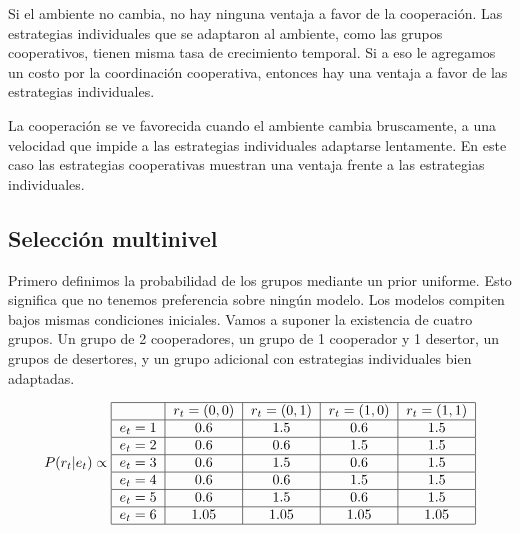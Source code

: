 \documentclass[a4paper,10pt]{article}
\begin{document}
Si el ambiente no cambia, no hay ninguna ventaja a favor de la cooperación.
Las estrategias individuales que se adaptaron al ambiente, como las grupos cooperativos, tienen misma tasa de crecimiento temporal.
Si a eso le agregamos un costo por la coordinación cooperativa, entonces hay una ventaja a favor de las estrategias individuales.

La cooperación se ve favorecida cuando el ambiente cambia bruscamente, a una velocidad que impide a las estrategias individuales adaptarse lentamente.
En este caso las estrategias cooperativas muestran una ventaja frente a las estrategias individuales.

\subsection{Selección multinivel}

Primero definimos la probabilidad de los grupos mediante un prior uniforme.
Esto significa que no tenemos preferencia sobre ningún modelo.
Los modelos compiten bajos mismas condiciones iniciales.
Vamos a suponer la existencia de cuatro grupos.
Un grupo de 2 cooperadores, un grupo de 1 cooperador y 1 desertor, un grupos de desertores, y un grupo adicional con estrategias individuales bien adaptadas.

\begin{align}
\centering
P(r_{t}|e_{t}) \propto \begin{tabular}{|c|c|c|c|c|c|c|}
        \hline
        & $r_t=(0,0)$ & $r_t=(0,1)$ & $r_t=(1,0)$ &  $r_t=(1,1)$  \\ \hline
       $e_{t}=1$ & $0.6$ & $1.5$ & $0.6$ & $1.5$ \\ \hline
       $e_{t}=2$ & $0.6$ & $0.6$ & $1.5$ & $1.5$  \\ \hline
       $e_{t}=3$ & $0.6$ & $1.5$ & $0.6$ & $1.5$  \\ \hline
       $e_{t}=4$ & $0.6$ & $0.6$ & $1.5$ & $1.5$ \\ \hline
       $e_{t}=5$ & $0.6$ & $1.5$ & $0.6$ & $1.5$ \\ \hline
       $e_{t}=6$ & $1.05$ & $1.05$ & $1.05$ & $1.05$  \\ \hline
\end{tabular}
\end{align}
\end{document}
